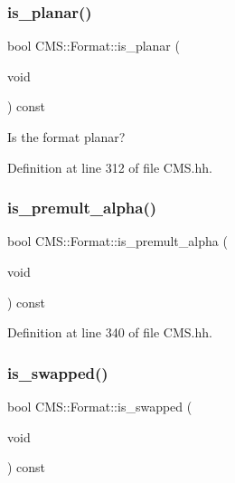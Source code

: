 \subsubsection{\texorpdfstring{is\+\_\+planar()}{is\_planar()}}
{\footnotesize\ttfamily bool C\+M\+S\+::\+Format\+::is\+\_\+planar (\begin{DoxyParamCaption}\item[{void}]{ }\end{DoxyParamCaption}) const\hspace{0.3cm}{\ttfamily [inline]}}



Is the format planar? 



Definition at line 312 of file C\+M\+S.\+hh.

\mbox{\label{class_c_m_s_1_1_format_a61dddc7b2e1ef8a45153db56c9178455}} 
\subsubsection{\texorpdfstring{is\+\_\+premult\+\_\+alpha()}{is\_premult\_alpha()}}
{\footnotesize\ttfamily bool C\+M\+S\+::\+Format\+::is\+\_\+premult\+\_\+alpha (\begin{DoxyParamCaption}\item[{void}]{ }\end{DoxyParamCaption}) const\hspace{0.3cm}{\ttfamily [inline]}}



Definition at line 340 of file C\+M\+S.\+hh.

\mbox{\label{class_c_m_s_1_1_format_a8f92904c0d69c17cc978abf3cd6c22fb}} 
\subsubsection{\texorpdfstring{is\+\_\+swapped()}{is\_swapped()}}
{\footnotesize\ttfamily bool C\+M\+S\+::\+Format\+::is\+\_\+swapped (\begin{DoxyParamCaption}\item[{void}]{ }\end{DoxyParamCaption}) const\hspace{0.3cm}{\ttfamily [inline]}}



